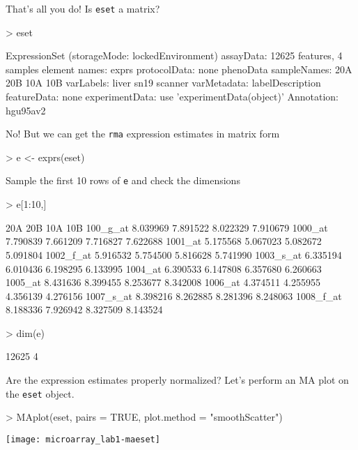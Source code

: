 \documentclass[12pt]{article}
\newcommand{\code}[1]{{\texttt{#1}}}
\begin{document}
That's all you do!  Is \code{eset} a matrix?
\begin{Schunk}
\begin{Sinput}
> eset
\end{Sinput}
\begin{Soutput}
ExpressionSet (storageMode: lockedEnvironment)
assayData: 12625 features, 4 samples 
  element names: exprs 
protocolData: none
phenoData
  sampleNames: 20A 20B 10A 10B
  varLabels: liver sn19 scanner
  varMetadata: labelDescription
featureData: none
experimentData: use 'experimentData(object)'
Annotation: hgu95av2 
\end{Soutput}
\end{Schunk}

No!  But we can get the \code{rma} expression estimates in matrix form
\begin{Schunk}
\begin{Sinput}
> e <- exprs(eset)
\end{Sinput}
\end{Schunk}

Sample the first 10 rows of \code{e} and check the dimensions
\begin{Schunk}
\begin{Sinput}
> e[1:10,]
\end{Sinput}
\begin{Soutput}
               20A      20B      10A      10B
100_g_at  8.039969 7.891522 8.022329 7.910679
1000_at   7.790839 7.661209 7.716827 7.622688
1001_at   5.175568 5.067023 5.082672 5.091804
1002_f_at 5.916532 5.754500 5.816628 5.741990
1003_s_at 6.335194 6.010436 6.198295 6.133995
1004_at   6.390533 6.147808 6.357680 6.260663
1005_at   8.431636 8.399455 8.253677 8.342008
1006_at   4.374511 4.255955 4.356139 4.276156
1007_s_at 8.398216 8.262885 8.281396 8.248063
1008_f_at 8.188336 7.926942 8.327509 8.143524
\end{Soutput}
\begin{Sinput}
> dim(e)
\end{Sinput}
\begin{Soutput}
[1] 12625     4
\end{Soutput}
\end{Schunk}

Are the expression estimates properly normalized?  Let's perform an MA plot on the \code{eset} object.

\begin{Schunk}
\begin{Sinput}
> MAplot(eset, pairs = TRUE, plot.method = "smoothScatter")
\end{Sinput}
\end{Schunk}
\texttt{[image: microarray\_lab1-maeset]}
\end{document}

